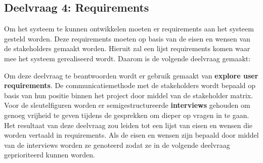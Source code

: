 \subsection{Deelvraag 4: Requirements}
Om het systeem te kunnen ontwikkelen moeten er requirements aan het systeem gesteld worden.
Deze requirements moeten op basis van de eisen en wensen van de stakeholders gemaakt worden.
Hieruit zal een lijst requirements komen waar mee het systeem gerealiseerd wordt.
Daarom is de volgende deelvraag gemaakt:

\begin{center}
 \textit{\SubquestionFour}
\end{center}

\whitespace[0.2]
Om deze deelvraag te beantwoorden wordt er gebruik gemaakt van \textbf{explore user requirements}.
De communicatiemethode met de stakeholders wordt bepaald op basis van hun positie binnen het project door middel van de stakeholder matrix.
Voor de sleutelfiguren worden er semigestructureerde \textbf{interviews} gehouden om genoeg vrijheid te geven tijdens de gesprekken om dieper op vragen in te gaan.
Het resultaat van deze deelvraag zou leiden tot een lijst van eisen en wensen die worden vertaald in requirements.
Als de eisen en wensen zijn bepaald door middel van de interviews worden ze genoteerd zodat ze in de volgende deelvraag geprioriteerd kunnen worden.
